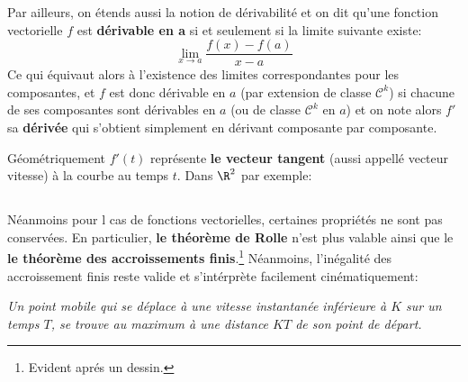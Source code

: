Par ailleurs, on étends aussi la notion de dérivabilité et on dit qu'une fonction vectorielle \(f\) est \textbf{dérivable en a} si et seulement si la limite suivante existe:
\[
   \lim_{x \rightarrow a} \frac{f(x) - f(a)}{x - a}
\]
Ce qui équivaut alors à l'existence des limites correspondantes pour les composantes, et \(f\) est donc dérivable en \(a\) (par extension de classe \(\mathcal{C}^k\)) si chacune de ses composantes sont dérivables en \(a\) (ou de classe \(\mathcal{C}^k\) en \(a\)) et on note alors \(f'\) sa \textbf{dérivée} qui s'obtient simplement en dérivant composante par composante.\<

Géométriquement \(f'(t)\) représente \textbf{le vecteur tangent} (aussi appellé vecteur vitesse) à la courbe au temps \(t\). Dans \(\R^2\) par exemple:
\begin{center}
\end{center}
\pagebreak
\subsection*{}
Néanmoins pour l cas de fonctions vectorielles, certaines propriétés ne sont pas conservées. En particulier, \textbf{le théorème de Rolle} n'est plus valable ainsi que le \textbf{le théorème des accroissements finis}.\footnote[1]{Evident aprés un dessin.}
Néanmoins, l'inégalité des accroissement finis reste valide et s'intérprète facilement cinématiquement:
\begin{center}
   \textit{Un point mobile qui se déplace à une vitesse instantanée inférieure à \(K\) sur un temps \(T\), se trouve au maximum à une distance \(KT\) de son point de départ.}
\end{center}

